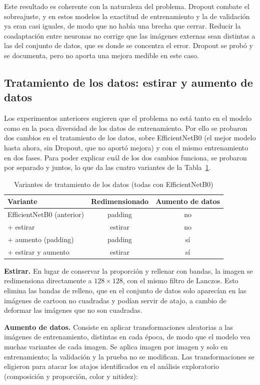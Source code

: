 \documentclass[letterpaper, 10 pt]{IEEEconf}
\begin{document}
Este resultado es coherente con la naturaleza del problema. Dropout combate el sobreajuste, y en estos modelos la exactitud de entrenamiento y la de validación ya eran casi iguales, de modo que no había una brecha que cerrar. Reducir la coadaptación entre neuronas no corrige que las imágenes externas sean distintas a las del conjunto de datos, que es donde se concentra el error. Dropout se probó y se documenta, pero no aporta una mejora medible en este caso.

\subsection{Tratamiento de los datos: estirar y aumento de datos}

Los experimentos anteriores sugieren que el problema no está tanto en el modelo como en la poca diversidad de los datos de entrenamiento. Por ello se probaron dos cambios en el tratamiento de los datos, sobre EfficientNetB0 (el mejor modelo hasta ahora, sin Dropout, que no aportó mejora) y con el mismo entrenamiento en dos fases. Para poder explicar cuál de los dos cambios funciona, se probaron por separado y juntos, lo que da las cuatro variantes de la Tabla~\ref{tab:variantes_datos}.

\begin{table}[H]
\caption{Variantes de tratamiento de los datos (todas con EfficientNetB0)}
\label{tab:variantes_datos}
\centering
\footnotesize
\begin{tabular}{lcc}
\hline
\textbf{Variante} & \textbf{Redimensionado} & \textbf{Aumento de datos} \\
\hline
EfficientNetB0 (anterior) & padding & no \\
+ estirar & estirar & no \\
+ aumento (padding) & padding & sí \\
+ estirar y aumento & estirar & sí \\
\hline
\end{tabular}
\end{table}

\textbf{Estirar.} En lugar de conservar la proporción y rellenar con bandas, la imagen se redimensiona directamente a $128 \times 128$, con el mismo filtro de Lanczos. Esto elimina las bandas de relleno, que en el conjunto de datos solo aparecían en las imágenes de cartoon no cuadradas y podían servir de atajo, a cambio de deformar las imágenes que no son cuadradas.

\textbf{Aumento de datos.} Consiste en aplicar transformaciones aleatorias a las imágenes de entrenamiento, distintas en cada época, de modo que el modelo vea muchas variantes de cada imagen. Se aplica imagen por imagen y solo en entrenamiento; la validación y la prueba no se modifican. Las transformaciones se eligieron para atacar los atajos identificados en el análisis exploratorio (composición y proporción, color y nitidez):
\end{document}
